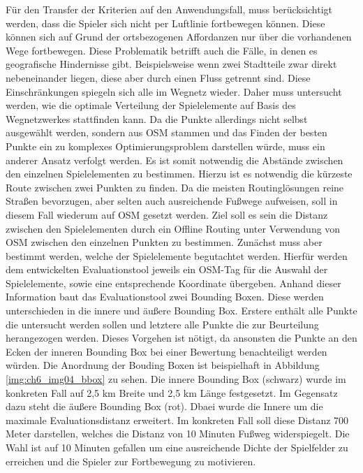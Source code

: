 Für den Transfer der Kriterien auf den Anwendungsfall, muss berücksichtigt werden, dass die Spieler sich nicht per Luftlinie fortbewegen können. Diese können sich auf Grund der ortsbezogenen Affordanzen nur über die vorhandenen Wege fortbewegen. Diese Problematik betrifft auch die Fälle, in denen es geografische Hindernisse gibt. Beispielsweise wenn zwei Stadtteile zwar direkt nebeneinander liegen, diese aber durch einen Fluss getrennt sind. Diese Einschränkungen spiegeln sich alle im Wegnetz wieder. Daher muss untersucht werden, wie die optimale Verteilung der Spielelemente auf Basis des Wegnetzwerkes stattfinden kann. Da die Punkte allerdings nicht selbst ausgewählt werden, sondern aus OSM stammen und das Finden der besten Punkte ein zu komplexes Optimierungsproblem darstellen würde, muss ein anderer Ansatz verfolgt werden. Es ist somit notwendig die Abstände zwischen den einzelnen Spielelementen  zu bestimmen. Hierzu ist es notwendig die kürzeste Route zwischen zwei Punkten zu finden.
Da die meisten Routinglösungen reine Straßen bevorzugen, aber selten auch ausreichende Fußwege aufweisen, soll in diesem Fall wiederum auf OSM gesetzt werden.
Ziel soll es sein die Distanz zwischen den Spielelementen durch ein Offline Routing unter Verwendung von OSM zwischen den einzelnen Punkten zu bestimmen.
Zunächst muss aber bestimmt werden, welche der Spielelemente begutachtet werden. Hierfür werden dem entwickelten Evaluationstool jeweils ein OSM-Tag für die Auswahl der Spielelemente, sowie eine entsprechende Koordinate übergeben. Anhand dieser Information baut das Evaluationstool zwei Bounding Boxen. Diese werden unterschieden in die innere und äußere Bounding Box. Erstere enthält alle Punkte die untersucht werden sollen und letztere alle Punkte die zur Beurteilung herangezogen werden. Dieses Vorgehen ist nötigt, da ansonsten die Punkte an den Ecken der inneren Bounding Box bei einer Bewertung benachteiligt werden würden.
Die Anordnung der Bouding Boxen ist beispielhaft in Abbildung \ref{img:ch6_img04_bbox} zu sehen.
Die innere Bounding Box (schwarz) wurde im konkreten Fall auf 2,5 km Breite und 2,5 km Länge festgesetzt. Im Gegensatz dazu steht die äußere Bounding Box (rot). Dbaei wurde die Innere um die maximale Evaluationsdistanz erweitert. Im konkreten Fall soll diese Distanz 700 Meter darstellen, welches die Distanz von 10 Minuten Fußweg widerspiegelt. Die Wahl ist auf 10 Minuten gefallen um eine ausreichende Dichte der Spielfelder zu erreichen und die Spieler zur Fortbewegung zu motivieren.


